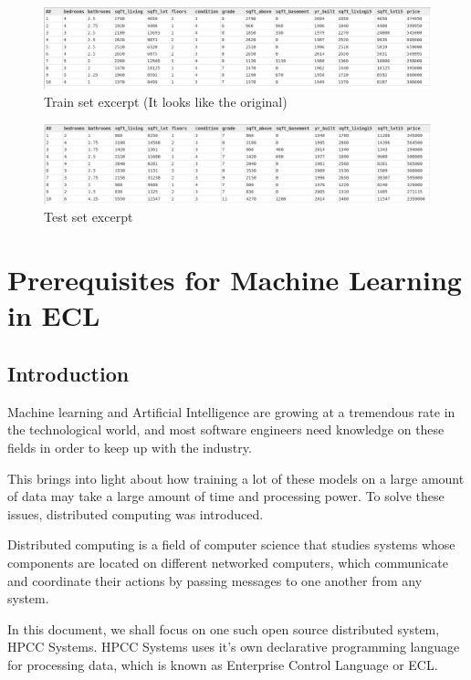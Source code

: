 \documentclass[a4paper,oneside,12pt]{book}
\begin{document}
\begin{figure}[h]
    \centering
    \includegraphics[width=\linewidth]{../output/55/train}
    \caption{Train set excerpt (It looks like the original)}
\end{figure}

\begin{figure}[h]
    \centering
    \includegraphics[width=\linewidth]{../output/55/test}
    \caption{Test set excerpt}
\end{figure}


\part{Prerequisites for Machine Learning in ECL}\label{part:prereqs}

\chapter{Introduction}\label{chap:intro}

Machine learning and Artificial Intelligence are growing at a tremendous rate in the technological world, and most software engineers need knowledge on these fields in order to keep up with the industry.

This brings into light about how training a lot of these models on a large amount of data may take a large amount of time and processing power. To solve these issues, distributed computing was introduced.

Distributed computing is a field of computer science that studies systems whose components are located on different networked computers, which communicate and coordinate their actions by passing messages to one another from any system.

In this document, we shall focus on one such open source distributed system, HPCC Systems. HPCC Systems uses it's own declarative programming language for processing data, which is known as Enterprise Control Language or ECL.
\end{document}
